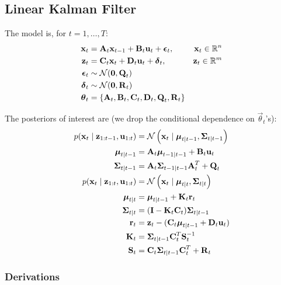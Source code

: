 \subsection{Linear Kalman Filter}
The model is, for $t = 1, \dotsc, T$:
\begin{align}
	\vec x_t 		&= \vec A_t \vec x_{t - 1} + \vec B_t \vec u_t + \vec\epsilon_t, & \vec x_t \in \mathbb R^n\\
	\vec z_t		&= \vec C_t \vec x_t + \vec D_t \vec u_t + \vec\delta_t, & \vec z_t \in \mathbb R^m\\
	\vec\epsilon_t	&\sim \Gauss(\vec 0, \vec Q_t) \\
	\vec\delta_t	&\sim \Gauss(\vec 0, \vec R_t) \\
	\vec\theta_t 	&= \{\vec A_t, \vec B_t, \vec C_t, \vec D_t, \vec Q_t, \vec R_t\}
\end{align}

The posteriors of interest are (we drop the conditional dependence on $\vec \theta_t$'s):
\begin{align}
	p(\vec x_t \mid \vec z_{1:t - 1}, \vec u_{1:t})	&= \Gauss\left(\vec x_t \mid \vec \mu_{t \mid t - 1}, \vec\Sigma_{t \mid t - 1}\right) \\
	\vec \mu_{t \mid t - 1}							&= \vec A_t \vec\mu_{t - 1 \mid t - 1} + \vec B_t \vec u_t \\
	\vec \Sigma_{t \mid t - 1}						&= \vec A_t \vec\Sigma_{t - 1 \mid t - 1} \vec A_t^T + \vec Q_t \\
	p(\vec x_t \mid \vec z_{1:t}, \vec u_{1:t}) 	&= \Gauss\left(\vec x_t \mid \vec \mu_{t \mid t}, \vec\Sigma_{t \mid t}\right) \\
	\vec \mu_{t \mid t}								&= \vec\mu_{t \mid t - 1} + \vec K_t \vec r_t \\
	\vec \Sigma_{t \mid t}							&= (\vec I - \vec K_t \vec C_t) \vec\Sigma_{t \mid t - 1} \\
	\vec r_t 										&= \vec z_t - (\vec C_t \vec \mu_{t \mid t - 1} + \vec D_t \vec u_t) \\
	\vec K_t										&= \vec\Sigma_{t \mid t - 1} \vec C_t^T \vec S_t^{-1} \\
	\vec S_t										&= \vec C_t \vec\Sigma_{t \mid t - 1}\vec C_t^T + \vec R_t
\end{align}

\subsubsection{Derivations}